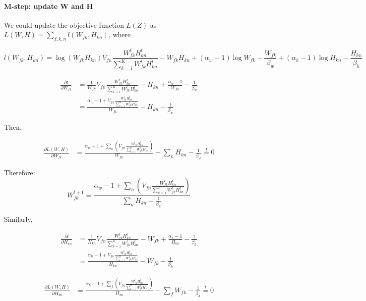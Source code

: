 \documentclass[11pt]{article}
\begin{document}
    \paragraph{M-step: update W and H}\label{m-step-update-w-and-h}

    We could update the objective function \(L(Z)\) as
\(L(W, H) = \sum_{f,k,n}l(W_{fk}, H_{kn})\), where

\[l(W_{fk}, H_{kn}) = \log (W_{fk}H_{kn}) V_{fn} \frac{W_{fk}^t H_{kn}^t}{\sum_{k=1}^K W_{fk}^t H_{kn}^t} -  W_{fk}H_{kn}  + (\alpha_w - 1)\log W_{fk} - \frac{W_{fk}}{\beta_w}  +  (\alpha_h - 1)\log H_{kn} - \frac{H_{kn}}{\beta_h}\]

    \begin{align}
\frac{\partial l}{\partial W_{fk}} 
& = \frac{1}{W_{fk}}V_{fn} \frac{W_{fk}^t H_{kn}^t}{\sum_{k=1}^K W_{fk}^t H_{kn}^t} - H_{kn} + \frac{\alpha_w - 1}{W_{fk}} - \frac{1}{\beta_w}\\
& =  \frac{\alpha_w - 1 + V_{fn} \frac{W_{fk}^t H_{kn}^t}{\sum_{k=1}^K W_{fk}^t H_{kn}^t}}{W_{fk}} - H_{kn}  - \frac{1}{\beta_w}
\end{align}

Then,

\begin{align}
\frac{\partial L(W, H) }{\partial W_{fk}} 
& = \frac{\alpha_w - 1 + \sum_n (V_{fn} \frac{W_{fk}^t H_{kn}^t}{\sum_{k=1}^K W_{fk}^t H_{kn}^t})}{W_{fk}} -\sum_n H_{kn}  - \frac{1}{\beta_w} \overset{!}{=} 0
\end{align}

Therefore:
\[ W_{fk}^{t+1} = \frac{\alpha_w - 1 + \sum_n (V_{fn} \frac{W_{fk}^t H_{kn}^t}{\sum_{k=1}^K W_{fk}^t H_{kn}^t}) }{\sum_n H_{kn}  + \frac{1}{\beta_w} }\]

    Similarly,

\begin{align}
\frac{\partial l}{\partial H_{kn}} 
& = \frac{1}{H_{kn}}V_{fn} \frac{W_{fk}^t H_{kn}^t}{\sum_{k=1}^K W_{fk}^t H_{kn}^t} - W_{fk} + \frac{\alpha_h - 1}{H_{kn}} - \frac{1}{\beta_h}\\
& =  \frac{\alpha_h - 1 + V_{fn} \frac{W_{fk}^t H_{kn}^t}{\sum_{k=1}^K W_{fk}^t H_{kn}^t}}{H_{kn}} - W_{fk}  - \frac{1}{\beta_h}
\end{align}

\begin{align}
\frac{\partial L(W, H)}{\partial H_{kn}} 
& = \frac{\alpha_h - 1 + \sum_f (V_{fn} \frac{W_{fk}^t H_{kn}^t}{\sum_{k=1}^K W_{fk}^t H_{kn}^t})}{H_{kn}} - \sum_f W_{fk}  - \frac{1}{\beta_h}  \overset{!}{=} 0
\end{align}
\end{document}

